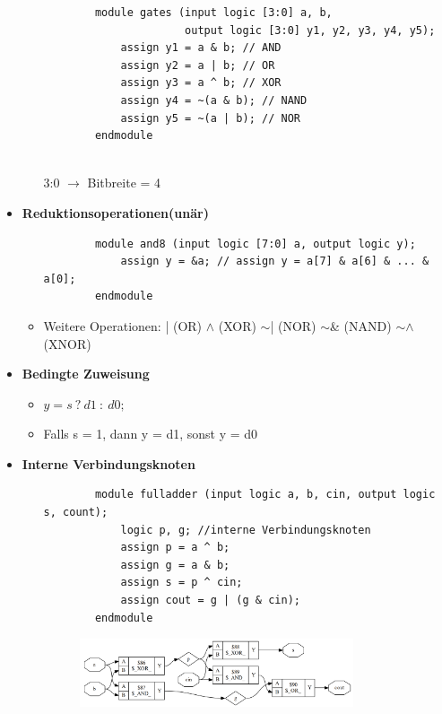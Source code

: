 \documentclass[11pt,a4paper]{article}
\begin{document}
\begin{itemize}
\begin{itemize}
	\item[] 
		\begin{lstlisting}
		module gates (input logic [3:0] a, b,
					  output logic [3:0] y1, y2, y3, y4, y5);
			assign y1 = a & b; // AND
			assign y2 = a | b; // OR
			assign y3 = a ^ b; // XOR
			assign y4 = ~(a & b); // NAND
			assign y5 = ~(a | b); // NOR
		endmodule		
		
		\end{lstlisting}	
		
	\item [3:0] $\rightarrow$ Bitbreite = 4

	\end{itemize}
	
\item \textbf{Reduktionsoperationen(unär)}
	\begin{itemize}
	
	\item[]
		\begin{lstlisting}
		module and8 (input logic [7:0] a, output logic y);
			assign y = &a; // assign y = a[7] & a[6] & ... & a[0];
		endmodule	
		\end{lstlisting}	
		
	\item Weitere Operationen: | (OR)   $\wedge$ (XOR)   $\sim$| (NOR)   $\sim$\& (NAND)   $\sim\wedge$ (XNOR)
	
	\end{itemize}
	
\item \textbf{Bedingte Zuweisung}
	\begin{itemize}
	\item $y = s ~ ? ~ d1~:~d0;$
	\item Falls s = 1, dann y = d1, sonst y = d0
	\end{itemize}

\item \textbf{Interne Verbindungsknoten}
	\begin{itemize}
	\item[]
		\begin{lstlisting}
		module fulladder (input logic a, b, cin, output logic s, count);
			logic p, g; //interne Verbindungsknoten
			assign p = a ^ b;
			assign g = a & b;
			assign s = p ^ cin;
			assign cout = g | (g & cin);
		endmodule
		\end{lstlisting}
		
	\item[] \begin{figure}[H]
				\begin{center}
				\includegraphics[height=2cm]{Bilder/verbindungsknoten}
				\end{center}
			\end{figure}
	\end{itemize}
	

\end{itemize}
\end{document}
